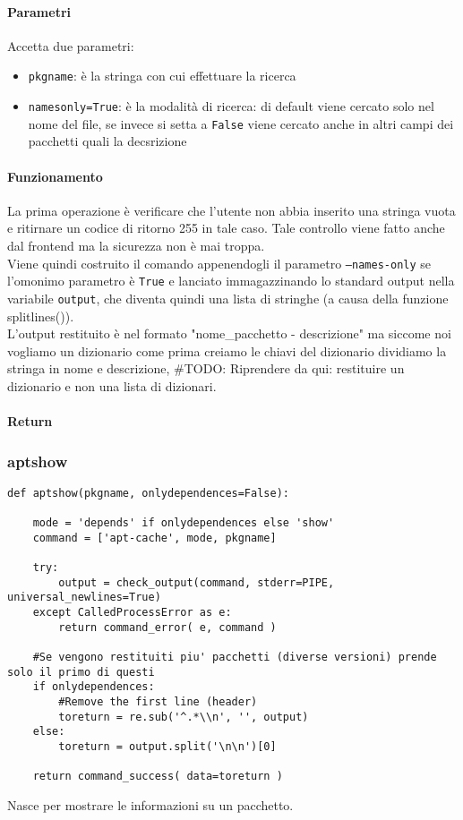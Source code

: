 \documentclass[11pt]{article}
\begin{document}
\paragraph{Parametri}
Accetta due parametri:
\begin{itemize}
	\item{\texttt{pkgname}: è la stringa con cui effettuare la ricerca}
	\item{\texttt{namesonly=True}: è la modalità di ricerca: di default viene cercato solo nel
		nome del file, se invece si setta a \texttt{False} viene cercato anche in altri campi
		dei pacchetti quali la decsrizione}
\end{itemize}
\paragraph{Funzionamento}
La prima operazione è verificare che l'utente non abbia inserito una stringa vuota e ritirnare un codice di ritorno 255
in tale caso. Tale controllo viene fatto anche dal frontend ma la sicurezza non è mai troppa.\\
Viene quindi costruito il comando appenendogli il parametro \texttt{--names-only} se l'omonimo parametro è \texttt{True}
e lanciato immagazzinando lo standard output nella variabile \texttt{output}, che diventa quindi una lista di stringhe
(a causa della funzione splitlines()).\\
L'output restituito è nel formato "nome\_pacchetto - descrizione" ma siccome noi vogliamo un dizionario come prima
creiamo le chiavi del dizionario dividiamo la stringa in nome e descrizione, 
\#TODO: Riprendere da qui: restituire un dizionario e non una lista di dizionari.
\paragraph{Return}

\subsubsection{aptshow}\label{aptshow}
\begin{lstlisting}
def aptshow(pkgname, onlydependences=False):
    
    mode = 'depends' if onlydependences else 'show'
    command = ['apt-cache', mode, pkgname]

    try:
        output = check_output(command, stderr=PIPE, universal_newlines=True)
    except CalledProcessError as e:
        return command_error( e, command )
    
    #Se vengono restituiti piu' pacchetti (diverse versioni) prende solo il primo di questi
    if onlydependences:
        #Remove the first line (header)
        toreturn = re.sub('^.*\\n', '', output)
    else:
        toreturn = output.split('\n\n')[0]
        
    return command_success( data=toreturn )
\end{lstlisting}
Nasce per mostrare le informazioni su un pacchetto.
\end{document}
